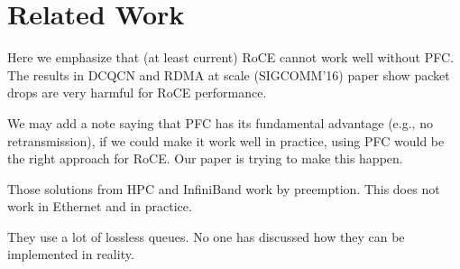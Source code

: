 \section{Related Work}\label{sec:related}

Here we emphasize that (at least current) RoCE cannot work well without PFC.
The results in DCQCN and RDMA at scale (SIGCOMM'16) paper show packet drops
are very harmful for RoCE performance.

We may add a note saying that PFC has its fundamental advantage (e.g., no retransmission),
if we could make it work well in practice, using PFC would be the right approach
for RoCE. Our paper is trying to make this happen.

 Those solutions from HPC and InfiniBand
work by preemption. This does not work in Ethernet and in practice.

 They use a lot of lossless queues. No one
has discussed how they can be implemented in reality.


